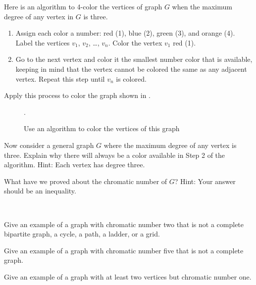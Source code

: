 \begin{exer}[\exerE] %
\label{exer_graph_color_algorithm}
    Here is an algorithm to 4-color the vertices of graph $G$ when the maximum degree of any vertex in $G$ is three.  
        \begin{enumerate}
            \item Assign each color a number: red (1), blue (2), green (3), and orange (4).  Label the vertices $v_1$, $v_2$, \ldots, $v_n$.  Color the vertex $v_1$ red (1). 
            \item Go to the next vertex and color it the smallest number color that is available, keeping in mind that the vertex cannot be colored the same as any adjacent vertex. Repeat this step until $v_n$ is colored.
        \end{enumerate}
     
        \begin{exerpart}
            \item Apply this process to color the graph shown in .
                \begin{figure}[hbtp]
                    \centering
                    
                    \caption{Use an algorithm to color the vertices of this graph}.
                    \label{fig_ladder_cross_color}
                \end{figure}
        
            \item Now consider a general graph $G$ where the maximum degree of any vertex is three. Explain why there will always be a color available in Step 2 of the algorithm.  Hint: Each vertex has degree three.
            \item What have we proved about the chromatic number of $G$? Hint: Your answer should be an inequality.
        \end{exerpart}
\end{exer}

\begin{exer}[\exerE] %
\label{exer_examples_chromatic_number}
~
    \begin{exerpart}
        \item Give an example of a graph with chromatic number two that is not a complete bipartite graph, a cycle, a path, a ladder, or a grid.
        \item Give an example of a graph with chromatic number five that is not a complete graph.
        \item Give an example of a graph with at least two vertices but chromatic number one.
    \end{exerpart}
\end{exer}

